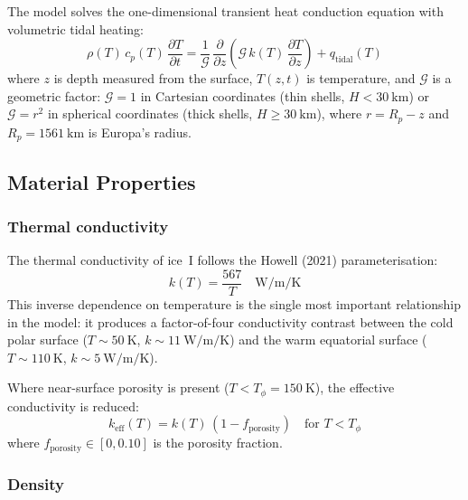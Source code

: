 \documentclass[11pt,a4paper]{article}
\newcommand{\pp}{\partial}
\begin{document}
The model solves the one-dimensional transient heat conduction equation
with volumetric tidal heating:
\begin{equation}
\rho(T)\, c_p(T)\, \frac{\pp T}{\pp t}
  = \frac{1}{\mathcal{G}}\,\frac{\pp}{\pp z}
    \left(\mathcal{G}\, k(T)\, \frac{\pp T}{\pp z}\right)
  + q_{\mathrm{tidal}}(T)
\label{eq:heat}
\end{equation}
where $z$ is depth measured from the surface, $T(z,t)$ is temperature,
and $\mathcal{G}$ is a geometric factor: $\mathcal{G} = 1$ in Cartesian
coordinates (thin shells, $H < \SI{30}{\kilo\metre}$) or
$\mathcal{G} = r^2$ in spherical coordinates (thick shells,
$H \geq \SI{30}{\kilo\metre}$), where $r = R_p - z$ and
$R_p = \SI{1561}{\kilo\metre}$ is Europa's radius.

\subsection{Material Properties}

\subsubsection{Thermal conductivity}

The thermal conductivity of ice~I follows the Howell (2021) parameterisation:
\begin{equation}
k(T) = \frac{567}{T} \quad \si{\watt\per\metre\per\kelvin}
\label{eq:conductivity}
\end{equation}
This inverse dependence on temperature is the single most important
relationship in the model: it produces a factor-of-four conductivity
contrast between the cold polar surface ($T \sim \SI{50}{\kelvin}$,
$k \sim \SI{11}{\watt\per\metre\per\kelvin}$) and the warm equatorial
surface ($T \sim \SI{110}{\kelvin}$,
$k \sim \SI{5}{\watt\per\metre\per\kelvin}$).

Where near-surface porosity is present ($T < T_\phi = \SI{150}{\kelvin}$),
the effective conductivity is reduced:
\begin{equation}
k_{\mathrm{eff}}(T) = k(T)\,(1 - f_{\mathrm{porosity}})
\quad \text{for } T < T_\phi
\label{eq:porosity}
\end{equation}
where $f_{\mathrm{porosity}} \in [0, 0.10]$ is the porosity fraction.

\subsubsection{Density}
\end{document}
